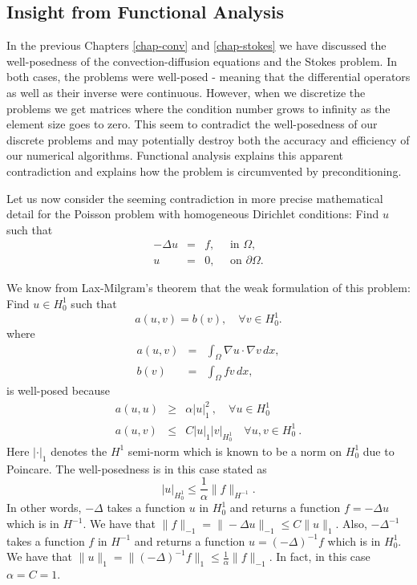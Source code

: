 \subsection{Insight from Functional Analysis}
In the previous Chapters \ref{chap-conv} and \ref{chap-stokes}
we have discussed the well-posedness of the convection-diffusion
equations and the Stokes problem. In both cases, the problems 
were well-posed - meaning that the differential operators
as well as their inverse were continuous. 
However, when we discretize the problems we get matrices
where the condition number grows to infinity as the element size goes to  
zero. This seem to contradict the well-posedness of our discrete problems
and may potentially destroy both the accuracy and efficiency 
of our numerical algorithms. Functional analysis explains this 
apparent contradiction and explains how the problem is circumvented by 
preconditioning.   

Let us now consider the seeming contradiction in more precise
mathematical detail for the Poisson problem 
with homogeneous Dirichlet conditions:  
Find $u$ such that 
\begin{eqnarray}
- \Delta u &=& f, \quad \text{ in } \Omega,  \\     
u &=& 0, \quad \text{ on } \partial \Omega .  
\end{eqnarray}

We know from Lax-Milgram's theorem that 
the weak formulation of this problem: 
Find $u\in H^1_0$ such that 
\[
a(u, v) = b(v), \quad \forall v\in H^1_0 .   
\]
where 
\begin{eqnarray}
a(u,v) &=& \int_\Omega \nabla u \cdot \nabla v \, dx, \\   
b(v)   &=& \int_\Omega  f  v \, dx,   
\end{eqnarray}
is well-posed because 
\begin{eqnarray}
a(u,u) &\ge& \alpha |u|^2_{1} \ , \quad \forall u \in H^1_0  \\ 
a(u,v) &\le& C |u|_{1} |v|_{H_0^1} \quad \forall u,v \in H^1_0   \ . 
\end{eqnarray}
Here $|\cdot|_{1}$ denotes the $H^1$ semi-norm which is known to 
be a norm on $H^1_0$ due to Poincare.  
The well-posedness is in this case stated as
\begin{equation}
|u|_{H_0^1} \le \frac{1}{\alpha} \|f\|_{H^{-1}} .  
\end{equation}
In other words, $-\Delta$ takes a function $u$ in $H^1_0$ and  
returns a function $f=-\Delta u$ which is in $H^{-1}$. We
have that $\|f\|_{-1} = \|-\Delta u\|_{-1} \le C \|u\|_1$.     
Also, $-\Delta^{-1}$ takes a function $f$ in $H^{-1}$ and  
returns a function $u=(-\Delta)^{-1} f$ which is in $H^1_0$. We
have that $\|u\|_{1} = \|(-\Delta)^{-1} f\|_{1} \le \frac{1}{\alpha} \|f\|_{-1}$.     
In fact, in this case $\alpha=C=1$. 

